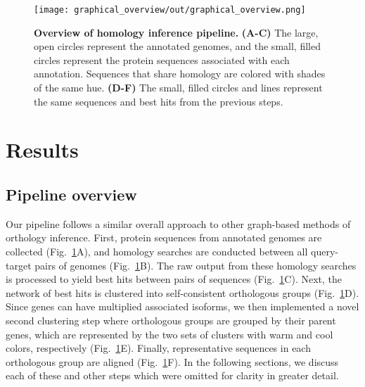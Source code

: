 \begin{figure}[h!]
\texttt{[image: graphical\_overview/out/graphical\_overview.png]}
\centering
\caption{\textbf{Overview of homology inference pipeline.}
\textbf{(A-C)} The large, open circles represent the annotated genomes, and the small, filled circles represent the protein sequences associated with each annotation. Sequences that share homology are colored with shades of the same hue. \textbf{(D-F)} The small, filled circles and lines represent the same sequences and best hits from the previous steps.}
\label{fig:graphical_overview}
\end{figure}

\section{Results}
\subsection{Pipeline overview}
Our pipeline follows a similar overall approach to other graph-based methods of orthology inference. First, protein sequences from annotated genomes are collected (Fig.~\ref{fig:graphical_overview}A), and homology searches are conducted between all query-target pairs of genomes (Fig.~\ref{fig:graphical_overview}B). The raw output from these homology searches is processed to yield best hits between pairs of sequences (Fig.~\ref{fig:graphical_overview}C). Next, the network of best hits is clustered into self-consistent orthologous groups (Fig.~\ref{fig:graphical_overview}D). Since genes can have multiplied associated isoforms, we then implemented a novel second clustering step where orthologous groups are grouped by their parent genes, which are represented by the two sets of clusters with warm and cool colors, respectively (Fig.~\ref{fig:graphical_overview}E). Finally, representative sequences in each orthologous group are aligned (Fig.~\ref{fig:graphical_overview}F). In the following sections, we discuss each of these and other steps which were omitted for clarity in greater detail.

